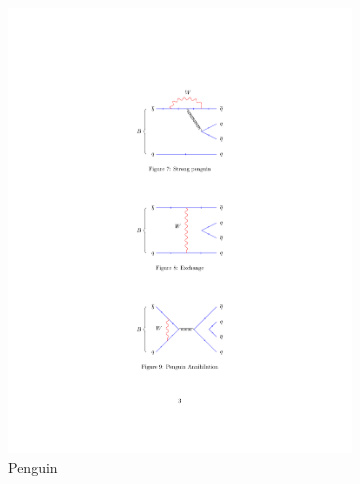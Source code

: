 \begin{figure}[!h]
\begin{subfigure}[b]{0.32\textwidth}
        \includegraphics[width=1.0\textwidth]{figs/Theory/Peng.pdf}
        \caption{Penguin}
    \end{subfigure}
    \begin{subfigure}[b]{0.32\textwidth}
        \centering

\end{subfigure}
\end{figure}
